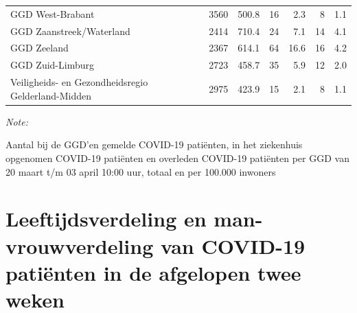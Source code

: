 \documentclass[
  english,
  man,floatsintext]{apa6}
\begin{document}
\begin{table}
\begin{threeparttable}
\begin{tabular}{lrrrrrr}
GGD West-Brabant & 3560 & 500.8 & 16 & 2.3 & 8 & 1.1\\
GGD Zaanstreek/Waterland & 2414 & 710.4 & 24 & 7.1 & 14 & 4.1\\
GGD Zeeland & 2367 & 614.1 & 64 & 16.6 & 16 & 4.2\\
GGD Zuid-Limburg & 2723 & 458.7 & 35 & 5.9 & 12 & 2.0\\
Veiligheids- en Gezondheidsregio Gelderland-Midden & 2975 & 423.9 & 15 & 2.1 & 8 & 1.1\\
\bottomrule
\end{tabular}
\begin{tablenotes}
\item \textit{Note: } 
\item Aantal bij de GGD’en gemelde COVID-19 patiënten, in het ziekenhuis opgenomen COVID-19 patiënten en overleden COVID-19 patiënten per GGD van 20 maart t/m 03 april 10:00 uur, totaal en per 100.000 inwoners
\end{tablenotes}
\end{threeparttable}
\endgroup{}
\end{table}

\newpage

\hypertarget{leeftijdsverdeling-en-man-vrouwverdeling-van-covid-19-patiuxebnten-in-de-afgelopen-twee-weken}{%
\section{Leeftijdsverdeling en man-vrouwverdeling van COVID-19 patiënten in de afgelopen twee weken}\label{leeftijdsverdeling-en-man-vrouwverdeling-van-covid-19-patiuxebnten-in-de-afgelopen-twee-weken}}
\end{document}
